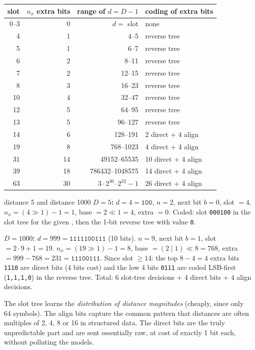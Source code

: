 \documentclass[11pt,a4paper,oneside]{book}
\newcommand{\code}[1]{\texttt{\detokenize{#1}}}
\newcommand{\bits}[1]{\texttt{#1}}
\begin{document}
\begin{center}
\small
\begin{tabular}{rrrl}
\toprule
slot & $n_x$ extra bits & range of $d=D-1$ & coding of extra bits\\
\midrule
0--3 & 0 & $d=$ slot & none\\
4 & 1 & 4--5 & reverse tree\\
5 & 1 & 6--7 & reverse tree\\
6 & 2 & 8--11 & reverse tree\\
7 & 2 & 12--15 & reverse tree\\
8 & 3 & 16--23 & reverse tree\\
10 & 4 & 32--47 & reverse tree\\
12 & 5 & 64--95 & reverse tree\\
13 & 5 & 96--127 & reverse tree\\
14 & 6 & 128--191 & 2 direct + 4 align\\
19 & 8 & 768--1023 & 4 direct + 4 align\\
31 & 14 & 49152--65535 & 10 direct + 4 align\\
39 & 18 & 786432--1048575 & 14 direct + 4 align\\
63 & 30 & $3\cdot2^{30}$--$2^{32}-1$ & 26 direct + 4 align\\
\bottomrule
\end{tabular}
\end{center}

\begin{workedex}{distance 5 and distance 1000}
\textbf{$D=5$:} $d=4=\bits{100}$, $n=2$, next bit $b=0$, slot $=4$. $n_x=(4\gg1)-1=1$, base $=2\ll1=4$, extra $=0$. Coded: slot \bits{000100} in the slot tree for the
given \code{lenState}, then the 1-bit reverse tree with value \bits{0}.

\textbf{$D=1000$:} $d=999=\bits{1111100111}$ (10 bits). $n=9$, next bit $b=1$, slot $=2\cdot9+1=19$. $n_x=(19\gg1)-1=8$,
base $=(2\mid1)\ll8=768$, extra $=999-768=231=\bits{11100111}$. Since slot $\ge14$: the top $8-4=4$ extra bits \bits{1110} are direct bits
(4 bits cost) and the low 4 bits \bits{0111} are coded LSB-first (\bits{1,1,1,0}) in the \code{align} reverse tree. Total: 6 slot-tree decisions + 4 direct bits + 4 align decisions.
\end{workedex}

\begin{keyidea}
The slot tree learns the \emph{distribution of distance magnitudes} (cheaply, since only 64 symbols). The align bits capture
the common pattern that distances are often multiples of 2, 4, 8 or 16 in structured data. The direct bits are the truly unpredictable
part and are sent essentially raw, at cost of exactly 1 bit each, without polluting the models.
\end{keyidea}
\end{document}
